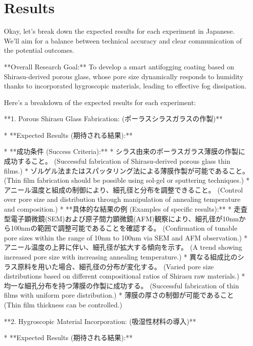 \documentclass{article}
\begin{document}
\section{Results}
Okay, let's break down the expected results for each experiment in Japanese.  We'll aim for a balance between technical accuracy and clear communication of the potential outcomes.

**Overall Research Goal:**  To develop a smart antifogging coating based on Shirasu-derived porous glass, whose pore size dynamically responds to humidity thanks to incorporated hygroscopic materials, leading to effective fog dissipation.

Here's a breakdown of the expected results for each experiment:

**1. Porous Shirasu Glass Fabrication: (ポーラスシラスガラスの作製)**

*   **Expected Results (期待される結果):**

    *   **成功条件 (Success Criteria):**
        *   シラス由来のポーラスガラス薄膜の作製に成功すること。 (Successful fabrication of Shirasu-derived porous glass thin films.)
        *   ゾルゲル法またはスパッタリング法による薄膜作製が可能であること。 (Thin film fabrication should be possible using sol-gel or sputtering techniques.)
        *   アニール温度と組成の制御により、細孔径と分布を調整できること。 (Control over pore size and distribution through manipulation of annealing temperature and composition.)
    *   **具体的な結果の例 (Examples of specific results):**
        *   走査型電子顕微鏡(SEM)および原子間力顕微鏡(AFM)観察により、細孔径が10nmから100nmの範囲で調整可能であることを確認する。 (Confirmation of tunable pore sizes within the range of 10nm to 100nm via SEM and AFM observation.)
        *   アニール温度の上昇に伴い、細孔径が拡大する傾向を示す。 (A trend showing increased pore size with increasing annealing temperature.)
        *   異なる組成比のシラス原料を用いた場合、細孔径の分布が変化する。 (Varied pore size distributions based on different compositional ratios of Shirasu raw materials.)
        *   均一な細孔分布を持つ薄膜の作製に成功する。 (Successful fabrication of thin films with uniform pore distribution.)
        *   薄膜の厚さの制御が可能であること (Thin film thickness can be controlled.)

**2. Hygroscopic Material Incorporation: (吸湿性材料の導入)**

*   **Expected Results (期待される結果):**
\end{document}
